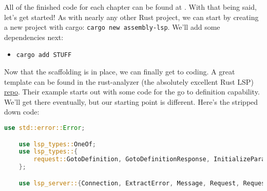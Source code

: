 All of the finished code for each chapter can be found at \URL. With that being said,
let's get started! As with nearly any other Rust project, we can start by creating a new
project with cargo: \texttt{cargo new assembly-lsp}. We'll add some dependencies next:

\begin{itemize}
    \item \texttt{cargo add STUFF}
\end{itemize}

Now that the scaffolding is in place, we can finally get to coding. A great template 
can be found in the rust-analyzer (the absolutely excellent Rust LSP) 
\href{https://github.com/rust-lang/rust-analyzer/tree/master/lib/lsp-server}{repo}. 
Their example starts out with some code for the go to definition capability. We'll 
get there eventually, but our starting point is different. Here's the stripped down code:


\begin{lstlisting}[language=rust]
    use std::error::Error;

    use lsp_types::OneOf;
    use lsp_types::{
        request::GotoDefinition, GotoDefinitionResponse, InitializeParams, ServerCapabilities,
    };

    use lsp_server::{Connection, ExtractError, Message, Request, RequestId, Response};
\end{lstlisting}










